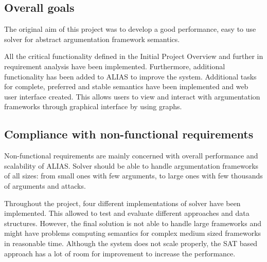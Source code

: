 \subsection{Overall goals}
The original aim of this project was to develop a good performance, easy to use solver for abstract argumentation framework semantics. 

All the critical functionality defined in the Initial Project Overview and further in requirement analysis have been implemented. Furthermore, additional functionality has been added to ALIAS to improve the system. Additional tasks for complete, preferred and stable semantics have been implemented and web user interface created. This allows users to view and interact with argumentation frameworks through graphical interface by using graphs.

\subsection{Compliance with non-functional requirements}
Non-functional requirements are mainly concerned with overall performance and scalability of ALIAS. Solver should be able to handle argumentation frameworks of all sizes: from small ones with few arguments, to large ones with few thousands of arguments and attacks. 

Throughout the project, four different implementations of solver have been implemented. This allowed to test and evaluate different approaches and data structures. However, the final solution is not able to handle large frameworks and might have problems computing semantics for complex medium sized frameworks in reasonable time. Although the system does not scale properly, the SAT based approach has a lot of room for improvement to increase the performance. 